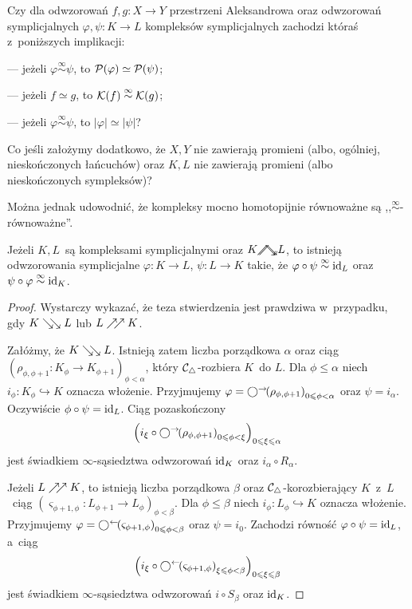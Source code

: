\begin{problem}\label{prob3}
Czy dla odwzorowań $f,g\colon X\to Y$ przestrzeni Aleksandrowa  oraz odwzorowań symplicjalnych $\varphi, \psi\colon K\to L$ kompleksów symplicjalnych zachodzi któraś z~poniższych implikacji:
\begin{compactitem}
\item[---] jeżeli $\varphi\stackrel{\infty}{\sim}\psi$, to $\mathcal{P}(\varphi)\simeq\mathcal{P}(\psi)$;
\item[---] jeżeli $f\simeq g$, to $\mathcal{K}(f)\stackrel{\infty}{\sim}\mathcal{K}(g)$;
\item[---] jeżeli $\varphi\stackrel{\infty}{\sim}\psi$, to $|\varphi|\simeq |\psi|$?
\end{compactitem}
Co jeśli założymy dodatkowo, że $X,Y$ nie zawierają promieni (albo, ogólniej, nieskończonych łańcuchów) oraz $K,L$ nie zawierają promieni (albo nieskończonych sympleksów)?
\end{problem}

Można jednak udowodnić, że kompleksy mocno homotopijnie równoważne są ,,\mbox{$\stackrel{\infty}{\sim}$-równoważne}''.

\begin{stw}\label{stw-stronghe_to_istnieja_odwzorowania_w_obie_strony}
Jeżeli $K,L$~są kompleksami symplicjalnymi oraz $K\stronghe L$, to istnieją odwzorowania symplicjalne $\varphi\colon K\to L$, $\psi\colon L\to K$ takie, że $\varphi\circ\psi \stackrel{\infty}{\sim} \operatorname{id}_L$ oraz $\psi\circ\varphi \stackrel{\infty}{\sim} \operatorname{id}_K$.
\end{stw}
\begin{proof}
Wystarczy wykazać, że teza stwierdzenia jest prawdziwa w~przypadku, gdy $K\searrow\!\!\searrow L$ lub $L\nearrow\!\!\nearrow K$.

Załóżmy, że $K\searrow\!\!\searrow L$. Istnieją zatem liczba porządkowa $\alpha$ oraz ciąg $\left(\rho_{\phi,\phi+1}\colon K_\phi\to K_{\phi+1}\right)_{\phi<\alpha}$, który \mbox{$\mathcal{C}_\triangle$-rozbiera} $K$~do $L$. Dla $\phi\leq \alpha$ niech $i_\phi\colon K_{\phi}\hookrightarrow K$ oznacza włożenie. Przyjmujemy $\varphi=\bigcirc^\rightarrow\!\!\left(\rho_{\phi,\phi+1}\right)_{0\leqslant\phi<\alpha}$ oraz $\psi=i_\alpha$. Oczywiście $\phi\circ \psi=\operatorname{id}_L$. Ciąg pozaskończony \[\left(i_\xi\circ \bigcirc^\rightarrow\!\!\left(\rho_{\phi,\phi+1}\right)_{0\leqslant\phi<\xi}\right)_{0\leqslant \xi\leqslant\alpha}\] jest świadkiem $\infty$-sąsiedztwa odwzorowań $\operatorname{id}_K$ oraz $i_\alpha\circ R_\alpha$.

Jeżeli $L\nearrow\!\!\nearrow K$, to istnieją liczba porządkowa $\beta$ oraz $\mathcal{C}_\triangle$-korozbierający $K$~z~$L$~ciąg $\left(\varsigma_{\phi+1,\phi}\colon L_{\phi+1}\to L_{\phi}\right)_{\phi<\beta}$. Dla $\phi\leq \beta$ niech $i_\phi\colon L_\phi\hookrightarrow K$ oznacza włożenie. Przyjmujemy $\varphi=\bigcirc^\leftarrow\!\!\left(\varsigma_{\phi+1,\phi}\right)_{0\leqslant \phi< \beta}$ oraz $\psi=i_0$. Zachodzi równość $\varphi\circ \psi=\operatorname{id}_L$, a~ciąg \[\left(i_\xi\circ\bigcirc^\leftarrow\!\!\left(\varsigma_{\phi+1,\phi}\right)_{\xi\leqslant \phi< \beta}\right)_{0\leqslant\xi\leqslant\beta}\] jest świadkiem $\infty$-sąsiedztwa odwzorowań $i\circ S_\beta$ oraz $\operatorname{id}_K$. 
\end{proof}

